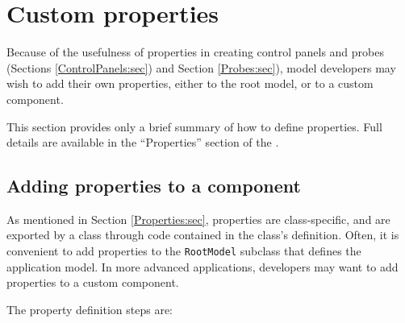 \section{Custom properties}
\label{CustomProperties:sec}

Because of the usefulness of properties in creating control panels and
probes (Sections \ref{ControlPanels:sec}) and Section
\ref{Probes:sec}), model developers may wish to add their own
properties, either to the root model, or to a custom component.

This section provides only a brief summary of how to define
properties. Full details are available in the ``Properties'' section of
the .

\subsection{Adding properties to a component}

As mentioned in Section \ref{Properties:sec}, properties are
class-specific, and are exported by a class through code contained in
the class's definition.  Often, it is convenient to add properties to
the {\tt RootModel} subclass that defines the application model. In
more advanced applications, developers may want to add properties to a
custom component.

The property definition steps are:

